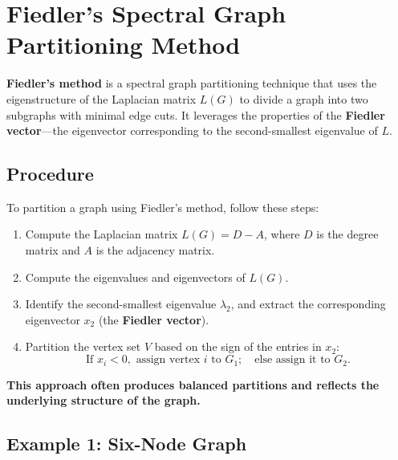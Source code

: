 \documentclass[hidelinks,12pt]{article}
\begin{document}
\section{Fiedler’s Spectral Graph Partitioning Method}

\textbf{Fiedler’s method} is a spectral graph partitioning technique that uses the eigenstructure of the Laplacian matrix \( L(G) \) to divide a graph into two subgraphs with minimal edge cuts. It leverages the properties of the \textbf{Fiedler vector}—the eigenvector corresponding to the second-smallest eigenvalue of \( L \).

\subsection{Procedure}
To partition a graph using Fiedler's method, follow these steps:

\begin{enumerate}
    \item Compute the Laplacian matrix \( L(G) = D - A \), where \( D \) is the degree matrix and \( A \) is the adjacency matrix.
    \item Compute the eigenvalues and eigenvectors of \( L(G) \).
    \item Identify the second-smallest eigenvalue \( \lambda_2 \), and extract the corresponding eigenvector \( x_2 \) (the \textbf{Fiedler vector}).
    \item Partition the vertex set \( V \) based on the sign of the entries in \( x_2 \):
    \[
    \text{If } x_i < 0, \text{ assign vertex } i \text{ to } G_1; \quad \text{else assign it to } G_2.
    \]
\end{enumerate}

\noindent \textbf{This approach often produces balanced partitions and reflects the underlying structure of the graph.}

\subsection{Example 1: Six-Node Graph}
\end{document}
